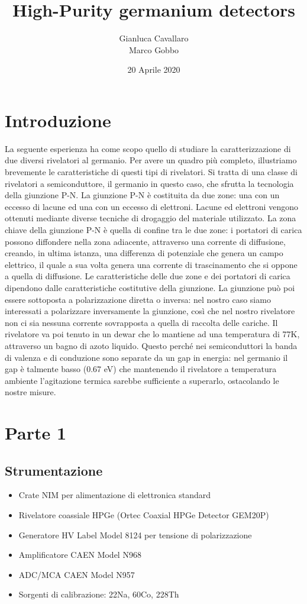 \documentclass[a4paper,10pt]{article}
\title{High-Purity germanium detectors}
\author{Gianluca Cavallaro \\ Marco Gobbo}
\date{20 Aprile 2020}
\begin{document}
\maketitle


\section{Introduzione}
La seguente esperienza ha come scopo quello di studiare la caratterizzazione di due diversi rivelatori al germanio. Per avere un quadro pi\`u completo, illustriamo brevemente le caratteristiche di questi tipi di rivelatori. Si tratta di una classe di rivelatori a semiconduttore, il germanio in questo caso, che sfrutta la tecnologia della giunzione P-N. La giunzione P-N \`e costituita da due zone: una con un eccesso di lacune ed una con un eccesso di elettroni. Lacune ed elettroni vengono ottenuti mediante diverse tecniche di drogaggio del materiale utilizzato. La zona chiave della giunzione P-N \`e quella di confine tra le due zone: i portatori di carica possono diffondere nella zona adiacente, attraverso una corrente di diffusione, creando, in ultima istanza, una differenza di potenziale che genera un campo elettrico, il quale a sua volta genera una corrente di trascinamento che si oppone a quella di diffusione. Le caratteristiche delle due zone e dei portatori di carica dipendono dalle caratteristiche costitutive della giunzione. La giunzione pu\`o poi essere sottoposta a polarizzazione diretta o inversa: nel nostro caso siamo interessati a polarizzare inversamente la giunzione, cos\`i che nel nostro rivelatore non ci sia nessuna corrente sovrapposta a quella di raccolta delle cariche. Il rivelatore va poi tenuto in un dewar che lo mantiene ad una temperatura di 77K, attraverso un bagno di azoto liquido. Questo perch\'e nei semiconduttori la banda di valenza e di conduzione sono separate da un gap in energia: nel germanio il gap \`e talmente basso (0.67 eV) che mantenendo il rivelatore a temperatura ambiente l'agitazione termica sarebbe sufficiente a superarlo, ostacolando le nostre misure.
\section{Parte 1}


\subsection{Strumentazione}
\begin{itemize}
\item Crate NIM per alimentazione di elettronica standard
\item Rivelatore coassiale HPGe (Ortec Coaxial HPGe Detector GEM20P)
\item Generatore HV Label Model 8124 per tensione di polarizzazione
\item Amplificatore CAEN Model N968
\item ADC/MCA CAEN Model N957
\item Sorgenti di calibrazione: 22Na, 60Co, 228Th
\end{itemize}
\end{document}
